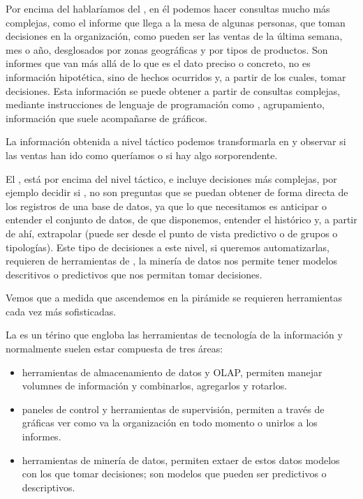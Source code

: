Por encima del  hablaríamos del , en él podemos hacer consultas mucho más complejas, como el informe que llega a la mesa de algunas personas, que toman decisiones en la organización, como pueden ser las ventas de la última semana, mes o año, desglosados por zonas geográficas y por tipos de productos. Son informes que van más allá de lo que es el dato preciso o concreto, no es información hipotética, sino de hechos ocurridos y, a partir de los cuales, tomar decisiones. Esta información se puede obtener a partir de consultas complejas, mediante instrucciones de lenguaje de programación como , agrupamiento, información que suele acompañarse de gráficos.

La información obtenida a nivel táctico podemos transformarla en  y observar si las ventas han ido como queríamos o si hay algo sorporendente.

El , está por encima del nivel táctico, e incluye decisiones más complejas, por ejemplo decidir si , no son preguntas que se puedan obtener de forma directa de los registros de una base de datos, ya que lo que necesitamos es anticipar o entender el conjunto de datos, de que disponemos, entender el histórico y, a partir de ahí, extrapolar (puede ser desde el punto de vista predictivo o de grupos o tipologías). Este tipo de decisiones a este nivel, si queremos automatizarlas, requieren de herramientas de , la minería de datos nos permite tener modelos descritivos o predictivos que nos permitan tomar decisiones.

Vemos que a medida que ascendemos en la pirámide se requieren herramientas cada vez más sofisticadas.

La  es un térino que engloba las herramientas de tecnología de la información y normalmente suelen estar compuesta de tres áreas:

\begin{itemize}
    \item herramientas de almacenamiento de datos y OLAP, permiten manejar volumnes de información y combinarlos, agregarlos y rotarlos.
    \item paneles de control y herramientas de supervisión, permiten a través de gráficas ver como va la organización en todo momento o unirlos a los informes.
    \item herramientas de minería de datos, permiten extaer de estos datos modelos con los que tomar decisiones; son modelos que pueden ser predictivos o descriptivos.
\end{itemize}

